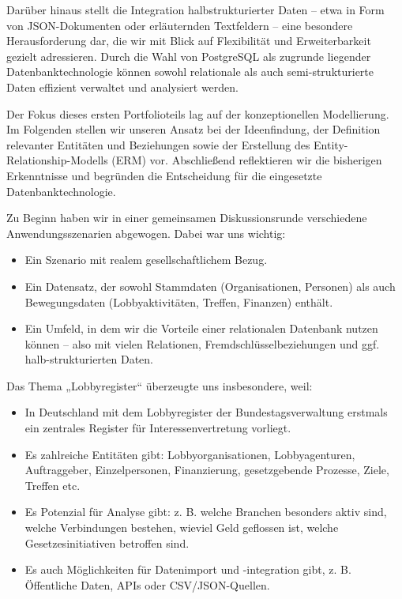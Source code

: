 \documentclass[12pt,twoside=false,a4paper,parskip]{scrbook}
\makeatletter
\renewcommand*{\chapter}{\secdef\@chapter\@schapter}
\makeatother
\begin{document}
Darüber hinaus stellt die Integration halbstrukturierter Daten – etwa in Form von JSON-Dokumenten oder erläuternden Textfeldern – eine besondere Herausforderung dar, die wir mit Blick auf Flexibilität und Erweiterbarkeit gezielt adressieren. Durch die Wahl von PostgreSQL als zugrunde liegender Datenbanktechnologie können sowohl relationale als auch semi-strukturierte Daten effizient verwaltet und analysiert werden.

Der Fokus dieses ersten Portfolioteils lag auf der konzeptionellen Modellierung. Im Folgenden stellen wir unseren Ansatz bei der Ideenfindung, der Definition relevanter Entitäten und Beziehungen sowie der Erstellung des Entity-Relationship-Modells (ERM) vor. Abschließend reflektieren wir die bisherigen Erkenntnisse und begründen die Entscheidung für die eingesetzte Datenbanktechnologie.

\chapter{Ideensammlung}
Zu Beginn haben wir in einer gemeinsamen Diskussionsrunde verschiedene Anwendungsszenarien abgewogen. Dabei war uns wichtig:

\begin{itemize}
  \item Ein Szenario mit realem gesellschaftlichem Bezug.
  \item Ein Datensatz, der sowohl Stammdaten (Organisationen, Personen) als auch Bewegungsdaten (Lobbyaktivitäten, Treffen, Finanzen) enthält.
  \item Ein Umfeld, in dem wir die Vorteile einer relationalen Datenbank nutzen können – also mit vielen Relationen, Fremdschlüsselbeziehungen und ggf. halb-strukturierten Daten.
\end{itemize}

Das Thema „Lobbyregister“ überzeugte uns insbesondere, weil:

\begin{itemize}
  \item In Deutschland mit dem Lobbyregister der Bundestagsverwaltung erstmals ein zentrales Register für Interessenvertretung vorliegt.
  \item Es zahlreiche Entitäten gibt: Lobbyorganisationen, Lobbyagenturen, Auftraggeber, Einzelpersonen, Finanzierung, gesetzgebende Prozesse, Ziele, Treffen etc.  
  \item Es Potenzial für Analyse gibt: z. B. welche Branchen besonders aktiv sind, welche Verbindungen bestehen, wieviel Geld geflossen ist, welche Gesetzesinitiativen betroffen sind.  
  \item Es auch Möglichkeiten für Datenimport und -integration gibt, z. B. Öffentliche Daten, APIs oder CSV/JSON-Quellen.
\end{itemize}
\end{document}
